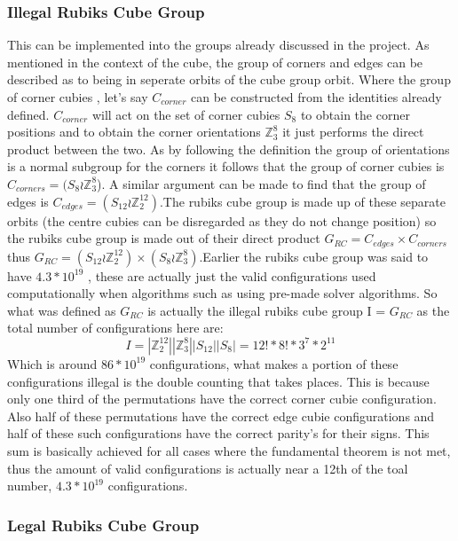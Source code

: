 \documentclass{article}
\begin{document}
\subsubsection{Illegal Rubiks Cube Group}
This can be implemented into the groups already discussed in the project. As mentioned in the context of the cube, the group of corners and edges can be described as to being in seperate orbits of the cube group orbit. Where the group of corner cubies , let's say $C_{corner}$ can be constructed from the identities already defined. $C_{corner}$ will act on the set of corner cubies $S_{8}$ to obtain the corner positions and to obtain the corner orientations $\mathbb{Z}_{3}^{8}$ it just performs the direct product between the two. As by following the definition the group of orientations is a normal subgroup for the corners it follows that the group of corner cubies is $C_{corners} = (S_8 \wr \mathbb{Z}_{3}^{8}$). A similar argument can be made to find that the group of edges is $C_{edges} = (S_{12} \wr \mathbb{Z}_{2}^{12})$.\newline The rubiks cube group is made up of these separate orbits (the centre cubies can be disregarded as they do not change position) so the rubiks cube group is made out of their direct product $G_{RC} = C_{edges} \times C_{corners}$ thus $G_{RC} = (S_{12} \wr \mathbb{Z}_{2}^{12}) \times (S_8 \wr \mathbb{Z}_{3}^{8})$.\newline Earlier the rubiks cube group was said to have $4.3*10^{19}$ , these are actually just the valid configurations used computationally when algorithms such as using pre-made solver algorithms. So what was defined as $G_{RC}$ is actually the illegal rubiks cube group I = $G_{RC}$ as the total number of configurations here are:
\begin{equation}\label{23}
I = |\mathbb{Z}_{2}^{12}||\mathbb{Z}_{3}^{8}||S_{12}||S_8| =  12! * 8! * 3^7 * 2^{11}
\end{equation}
Which is around $86 * 10^{19}$ configurations, what makes a portion of these configurations illegal is the double counting that takes places. This is because only one third of the permutations have the correct corner cubie configuration. Also half of these permutations have the correct edge cubie configurations and half of these such configurations have the correct parity's for their signs. This sum is basically achieved for all cases where the fundamental theorem is not met, thus the amount of valid configurations is actually near a 12th of the toal number,  $4.3*10^{19}$ configurations. 
\subsubsection{Legal Rubiks Cube Group}
\end{document}
